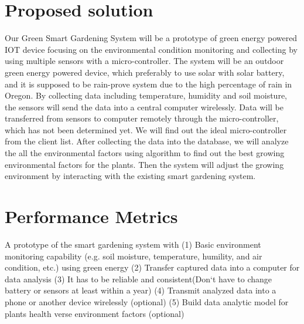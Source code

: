 \documentclass[letterpaper, fleqn, 10pt, onecolumn,singlespace]{article}
\begin{document}
\section*{Proposed solution}
	Our Green Smart Gardening System will be a prototype of green energy powered IOT device focusing on the environmental condition monitoring and collecting by using multiple sensors with a micro-controller. The system will be an outdoor green energy powered device, which preferably to use solar with solar battery, and it is supposed to be rain-prove system due to the high percentage of rain in Oregon. By collecting data including temperature, humidity and soil moisture, the sensors will send the data into a central computer wirelessly. Data will be transferred from sensors to computer remotely through the micro-controller, which has not been determined yet. We will find out the ideal micro-controller from the client list. After collecting the data into the database, we will analyze the all the environmental factors using algorithm to find out the best growing environmental factors for the plants. Then the system will adjust the growing environment by interacting with the existing smart gardening system.  

\section*{Performance Metrics}
	A prototype of the smart gardening system with 
\newline
(1)	Basic environment monitoring capability (e.g. soil moisture, temperature, humility, and air condition, etc.) using green energy
\newline
(2)	Transfer captured data into a computer for data analysis
\newline
(3) It has to be reliable and consistent(Don`t have to change battery or sensors at least within a year)
\newline
(4)	Transmit analyzed data into a phone or another device wirelessly (optional)
\newline
(5)	Build data analytic model for plants health verse environment factors (optional)
\end{document}
